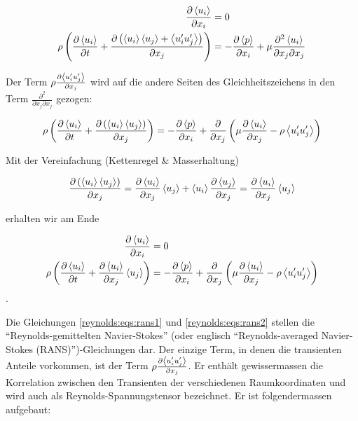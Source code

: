 \begin{align}
    \frac{\partial \left\langle u_i \right\rangle}{\partial x_i} &= 0 \\
    \rho \left(
            \frac{\partial \left\langle u_i \right\rangle}{\partial t} +
            \frac{\partial \left( \left\langle u_i \right\rangle \left\langle u_j \right\rangle + \left\langle u_i' u_j' \right\rangle\right)}{\partial x_j}
        \right) &=
        - \frac{\partial \left\langle p \right\rangle}{\partial x_i} + 
        \mu \frac{\partial^2 \left\langle u_i \right\rangle}{\partial x_j \partial x_j}
\end{align}

Der Term $\rho \frac{\partial \left\langle u_i' u_j' \right\rangle}{\partial x_j}$ wird auf die andere Seiten
des Gleichheitszeichens in den Term $\frac{\partial^2}{\partial x_j \partial x_j}$ gezogen:

\begin{equation}
    \rho \left(
            \frac{\partial \left\langle u_i \right\rangle}{\partial t} +
            \frac{\partial \left( \left\langle u_i \right\rangle \left\langle u_j \right\rangle\right)}{\partial x_j}
        \right) =
        - \frac{\partial \left\langle p \right\rangle}{\partial x_i} + 
            \frac{\partial}{\partial x_j} \left(
            \mu \frac{\partial \left\langle u_i \right\rangle}{\partial x_j} - \rho \left\langle u_i' u_j' \right\rangle
        \right)
\end{equation}

Mit der Vereinfachung (Kettenregel \& Masserhaltung)

\begin{equation}
    \frac{\partial \left( \left\langle u_i \right\rangle \left\langle u_j \right\rangle\right)}{\partial x_j} = \\
        \frac{\partial \left\langle u_i \right\rangle}{\partial x_j} \left\langle u_j \right\rangle +
        \left\langle u_i \right\rangle \frac{\partial \left\langle u_j \right\rangle}{\partial x_j} = \\
        \frac{\partial \left\langle u_i \right\rangle}{\partial x_j} \left\langle u_j \right\rangle
\end{equation}

erhalten wir am Ende

\begin{align}
    \label{reynolds:eqs:rans1}
    \frac{\partial \left\langle u_i \right\rangle}{\partial x_i} &= 0 \\
    \label{reynolds:eqs:rans2}
    \rho \left(
            \frac{\partial \left\langle u_i \right\rangle}{\partial t} +
            \frac{\partial \left\langle u_i \right\rangle}{\partial x_j} \left\langle u_j \right\rangle
        \right) &=
        - \frac{\partial \left\langle p \right\rangle}{\partial x_i} + 
            \frac{\partial}{\partial x_j} \left(
            \mu \frac{\partial \left\langle u_i \right\rangle}{\partial x_j} - \rho \left\langle u_i' u_j' \right\rangle
        \right)
\end{align}.

Die Gleichungen \ref{reynolds:eqs:rans1} und \ref{reynolds:eqs:rans2} stellen die
``Reynolds-gemittelten Navier-Stokes'' (oder englisch ``Reynolds-averaged
Navier-Stokes (RANS)'')-Gleichungen dar. Der einzige Term, in denen die transienten
Anteile vorkommen, ist der Term $\rho \frac{\partial \left\langle u_i' u_j' \right\rangle}{\partial x_j}$.
Er enthält gewissermassen die Korrelation zwischen den Transienten der verschiedenen
Raumkoordinaten und wird auch als Reynolds-Spannungstensor bezeichnet. Er ist folgendermassen
aufgebaut:

